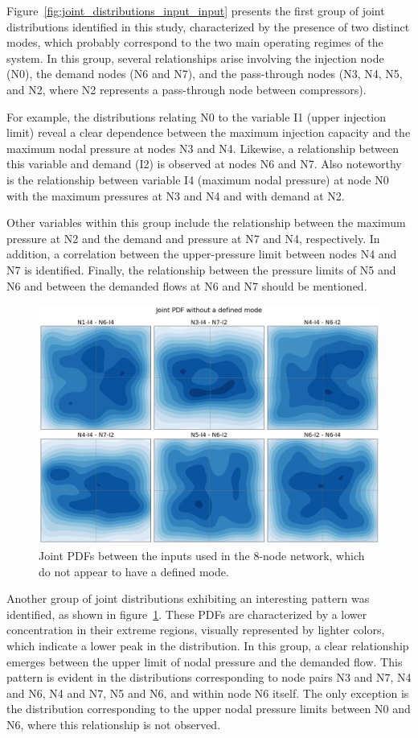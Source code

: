 Figure~\cref{fig:joint_distributions_input_input} presents the first group of joint distributions identified in this study, characterized by the presence of two distinct modes, which probably correspond to the two main operating regimes of the system. In this group, several relationships arise involving the injection node (N0), the demand nodes (N6 and N7), and the pass-through nodes (N3, N4, N5, and N2, where N2 represents a pass-through node between compressors).

For example, the distributions relating N0 to the variable I1 (upper injection limit) reveal a clear dependence between the maximum injection capacity and the maximum nodal pressure at nodes N3 and N4. Likewise, a relationship between this variable and demand (I2) is observed at nodes N6 and N7. Also noteworthy is the relationship between variable I4 (maximum nodal pressure) at node N0 with the maximum pressures at N3 and N4 and with demand at N2.

Other variables within this group include the relationship between the maximum pressure at N2 and the demand and pressure at N7 and N4, respectively. In addition, a correlation between the upper-pressure limit between nodes N4 and N7 is identified. Finally, the relationship between the pressure limits of N5 and N6 and between the demanded flows at N6 and N7 should be mentioned.

\begin{figure}
    \begin{center}
        \includegraphics[width=.67\textwidth]{figures/Chapter_NonLinealCensnet/PDF_inputs_inputs_no_mode.png}
    \end{center}
    \caption{Joint PDFs between the inputs used in the 8-node network, which do not appear to have a defined mode. }\label{fig:joint_distributions_input_input_no_mode}
\end{figure}
 

Another group of joint distributions exhibiting an interesting pattern was identified, as shown in figure~\cref{fig:joint_distributions_input_input_no_mode}. These PDFs are characterized by a lower concentration in their extreme regions, visually represented by lighter colors, which indicate a lower peak in the distribution. In this group, a clear relationship emerges between the upper limit of nodal pressure and the demanded flow. This pattern is evident in the distributions corresponding to node pairs N3 and N7, N4 and N6, N4 and N7, N5 and N6, and within node N6 itself. The only exception is the distribution corresponding to the upper nodal pressure limits between N0 and N6, where this relationship is not observed.

